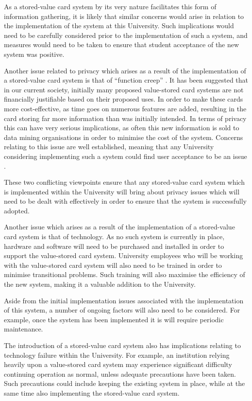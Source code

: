 As a stored-value card system by its very nature facilitates this form of information gathering, it is likely that similar concerns would arise in relation to the implementation of the system at this University. Such implications would need to be carefully considered prior to the implementation of such a system, and measures would need to be taken to ensure that student acceptance of the new system was positive.
 
Another issue related to privacy which arises as a result of the implementation of a stored-value card system is that of ``function creep'' \cite{bozak}. It has been suggested that in our current society, initially many proposed value-stored card systems are not financially justifiable based on their proposed uses. In order to make these cards more cost-effective, as time goes on numerous features are added, resulting in the card storing far more information than was initially intended. In terms of privacy this can have very serious implications, as often this new information is sold to data mining organisations in order to minimise the cost of the system. Concerns relating to this issue are well established, meaning that any University considering implementing such a system could find user acceptance to be an issue \cite{connoly}.

These two conflicting viewpoints ensure that any stored-value card system which is implemented within the University will bring about privacy issues which will need to be dealt with effectively in order to ensure that the system is successfully adopted. 

Another issue which arises as a result of the implementation of a stored-value card system is that of technology. As no such system is currently in place, hardware and software will need to be purchased and installed in order to support the value-stored card system. University employees who will be working with the value-stored card system will also need to be trained in order to minimise transitional problems. Such training will also maximise the efficiency of the new system, making it a valuable addition to the University.

Aside from the initial implementation issues associated with the implementation of this system, a number of ongoing factors will also need to be considered. For example, once the system has been implemented it is will require periodic maintenance. 

The introduction of a stored-value card system also has implications relating to technology failure within the University. For example, an institution relying heavily upon a value-stored card system may experience significant difficulty continuing operation as normal, unless adequate precautions have been taken. Such precautions could include keeping the existing system in place, while at the same time also implementing the stored-value card system.

